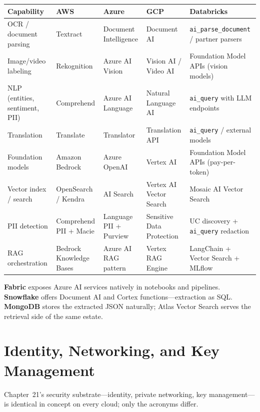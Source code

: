 \begin{center}
\footnotesize
\begin{tabular}{@{}p{2.4cm}p{2.9cm}p{2.9cm}p{2.9cm}p{2.9cm}@{}}
\toprule
\textbf{Capability} & \textbf{AWS} & \textbf{Azure} & \textbf{GCP} & \textbf{Databricks} \\
\midrule
OCR / document parsing & Textract & Document Intelligence & Document AI & \texttt{ai\_parse\_document} / partner parsers \\
Image/video labeling & Rekognition & Azure AI Vision & Vision AI / Video AI & Foundation Model APIs (vision models) \\
NLP (entities, sentiment, PII) & Comprehend & Azure AI Language & Natural Language AI & \texttt{ai\_query} with LLM endpoints \\
Translation & Translate & Translator & Translation API & \texttt{ai\_query} / external models \\
Foundation models & Amazon Bedrock & Azure OpenAI & Vertex AI & Foundation Model APIs (pay-per-token) \\
Vector index / search & OpenSearch / Kendra & AI Search & Vertex AI Vector Search & Mosaic AI Vector Search \\
\addlinespace
PII detection & Comprehend PII + Macie & Language PII + Purview & Sensitive Data Protection & UC discovery + \texttt{ai\_query} redaction \\
RAG orchestration & Bedrock Knowledge Bases & Azure AI RAG pattern & Vertex RAG Engine & LangChain + Vector Search + MLflow \\
\bottomrule
\end{tabular}
\end{center}

\noindent \textbf{Fabric} exposes Azure AI services natively in notebooks and pipelines.
\textbf{Snowflake} offers Document AI and Cortex functions---extraction as SQL.
\textbf{MongoDB} stores the extracted JSON naturally; Atlas Vector Search serves the retrieval
side of the same estate.

\section{Identity, Networking, and Key Management}
%
Chapter~21's security substrate---identity, private networking, key management---is identical in
concept on every cloud; only the acronyms differ.

